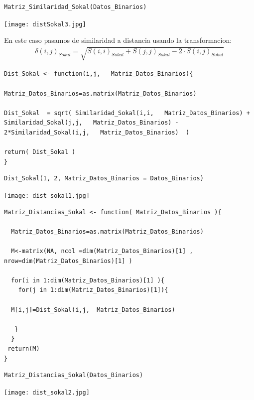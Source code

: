 \documentclass[12pt]{report} %
\begin{document}
\begin{lstlisting}
Matriz_Similaridad_Sokal(Datos_Binarios)
\end{lstlisting}

\texttt{[image: distSokal3.jpg]}

\newpage

En este caso pasamos de similaridad a distancia usando la transformacion: 
\begin{gather*}
 \delta(i,j)_{Sokal}= \sqrt{ S(i,i)_{Sokal} + S(j,j)_{Sokal} - 2\cdot S(i,j)_{Sokal} }
\end{gather*}  

\begin{lstlisting}
Dist_Sokal <- function(i,j,   Matriz_Datos_Binarios){

Matriz_Datos_Binarios=as.matrix(Matriz_Datos_Binarios)
  
Dist_Sokal  = sqrt( Similaridad_Sokal(i,i,   Matriz_Datos_Binarios) + Similaridad_Sokal(j,j,   Matriz_Datos_Binarios) - 2*Similaridad_Sokal(i,j,   Matriz_Datos_Binarios)  )
  
return( Dist_Sokal )
}
\end{lstlisting}

\begin{lstlisting}
Dist_Sokal(1, 2, Matriz_Datos_Binarios = Datos_Binarios)
\end{lstlisting}

\texttt{[image: dist\_sokal1.jpg]}

\begin{lstlisting}
Matriz_Distancias_Sokal <- function( Matriz_Datos_Binarios ){
  
  Matriz_Datos_Binarios=as.matrix(Matriz_Datos_Binarios)

  M<-matrix(NA, ncol =dim(Matriz_Datos_Binarios)[1] , nrow=dim(Matriz_Datos_Binarios)[1] )
  
  for(i in 1:dim(Matriz_Datos_Binarios)[1] ){
    for(j in 1:dim(Matriz_Datos_Binarios)[1]){
    
  M[i,j]=Dist_Sokal(i,j,  Matriz_Datos_Binarios)
  
   }
  }
 return(M)
}
\end{lstlisting}

\newpage

\begin{lstlisting}
Matriz_Distancias_Sokal(Datos_Binarios)
\end{lstlisting}

\texttt{[image: dist\_sokal2.jpg]}

 
\end{document}
